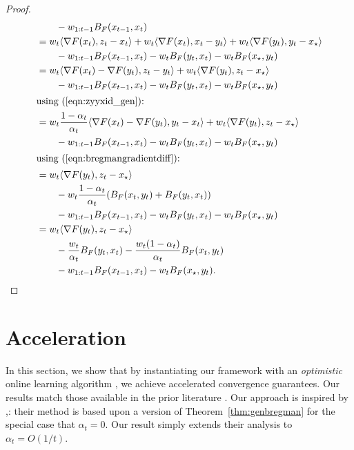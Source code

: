\documentclass{article}
\begin{document}
\begin{proof}
\begin{align*}
 &\qquad-w_{1:t-1} B_F(x_{t-1}, x_t)\\
    &= w_t\langle \nabla F(x_t), z_t -x_t\rangle + w_t \langle  \nabla F(x_t), x_t-y_t\rangle + w_t\langle \nabla F(y_t), y_t -x_\star\rangle\\
    &\qquad-w_{1:t-1} B_F(x_{t-1}, x_t)-w_tB_F(y_t,x_t) - w_tB_F(x_\star, y_t)\\
    &=w_t \langle \nabla F(x_t)-\nabla F(y_t), z_t  - y_t\rangle + w_t  \langle \nabla F(y_t), z_t -x_\star\rangle\\
    &\qquad-w_{1:t-1} B_F(x_{t-1}, x_t)-w_tB_F(y_t,x_t) - w_tB_F(x_\star, y_t)\\
    \intertext{using (\ref{eqn:zyyxid_gen}):}
    &= w_t \frac{1-\alpha_t}{\alpha_t} \langle \nabla F(x_t)-\nabla F(y_t), y_t - x_t\rangle  + w_t  \langle \nabla F(y_t), z_t -x_\star\rangle\\
    &\qquad-w_{1:t-1} B_F(x_{t-1}, x_t)-w_tB_F(y_t,x_t) - w_tB_F(x_\star, y_t)\\
    \intertext{using (\ref{eqn:bregmangradientdiff}):}
    &=  w_t  \langle \nabla F(y_t), z_t -x_\star\rangle\\
    &\qquad-w_t \frac{1-\alpha_t}{\alpha_t} (B_F(x_t, y_t) + B_F(y_t, x_t))\\
    &\qquad-w_{1:t-1} B_F(x_{t-1}, x_t)-w_tB_F(y_t,x_t) - w_tB_F(x_\star, y_t)\\
    &=  w_t  \langle \nabla F(y_t), z_t -x_\star\rangle\\
    &\qquad-\frac{w_t}{\alpha_t}B_F(y_t,x_t) - \frac{w_t(1-\alpha_t)}{\alpha_t}B_F(x_t, y_t) \\
    &\qquad- w_{1:t-1} B_F(x_{t-1},x_t) - w_t B_F(x_\star, y_t).
\end{align*}
\end{proof} \section{Acceleration}\label{sec:acceleration}

In this section, we show that by instantiating our framework with  an \emph{optimistic} online learning  algorithm  \citep{rakhlin2013online}, we  achieve accelerated  convergence guarantees. Our results match those available in the prior literature \citep{kavis2019unixgrad, joulani2020simpler}. Our approach is inspired by \cite{joulani2020simpler},: their  method is based upon a version of Theorem~\ref{thm:genbregman} for the special case that $\alpha_t=0$. Our result simply extends their analysis to $\alpha_t=O(1/t)$.
\end{document}
